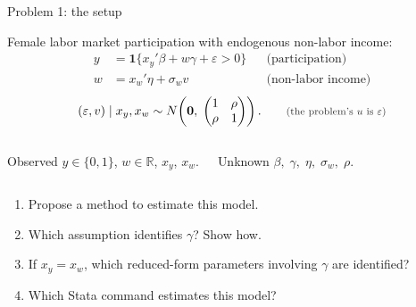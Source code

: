 \documentclass[aspectratio=169,11pt]{beamer}
\newcommand{\ind}{\mathbf{1}}
\newcommand{\Part}[1]{\textcolor{DarkRed}{\textbf{(#1)}}}
\begin{document}
\begin{frame}{Problem 1: the setup}

Female labor market participation with endogenous non-labor income:
\begin{align*}
y &= \ind\{x_y'\beta + w\gamma + \varepsilon > 0\}
  &&\text{(participation)}\\
w &= x_w'\eta + \sigma_w v
  &&\text{(non-labor income)}
\end{align*}
\[
(\varepsilon, v)\mid x_y, x_w \sim N\!\left(\bm 0,\;
\begin{pmatrix} 1 & \rho\\ \rho & 1\end{pmatrix}\right).
\qquad
\text{\textcolor{DarkGray}{\footnotesize (the problem's $u$ is $\varepsilon$)}}
\]

\begin{columns}[T]
\begin{block}{Observed}
$y\in\{0,1\}$, \; $w\in\mathbb R$, \; $x_y$, \; $x_w$.
\end{block}
\begin{block}{Unknown}
$\beta,\;\gamma,\;\eta,\;\sigma_w,\;\rho$.
\end{block}
\end{columns}

\vspace{0.3em}

\begin{enumerate}\small
  \item[\Part{1}] Propose a method to estimate this model.
  \item[\Part{2}] Which assumption identifies $\gamma$? Show how.
  \item[\Part{3}] If $x_y=x_w$, which reduced-form parameters involving $\gamma$ are identified?
  \item[\Part{4}] Which Stata command estimates this model?
\end{enumerate}

\end{frame}
\end{document}
